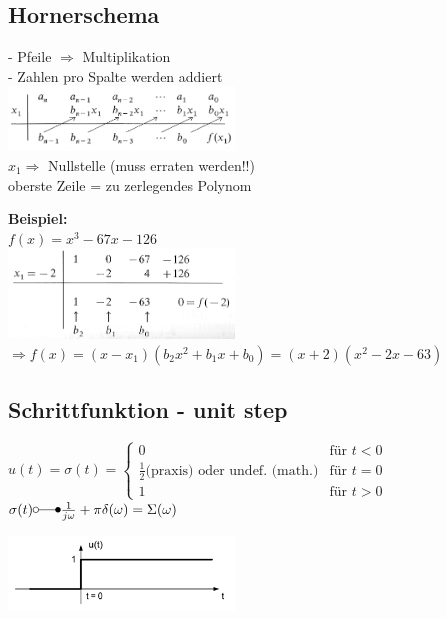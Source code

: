 \subsection{Hornerschema}
	\begin{minipage}[t]{9cm}
		- Pfeile $\Rightarrow$ Multiplikation\\
		- Zahlen pro Spalte werden addiert\\
		\includegraphics[width=6cm]{./bilder/hornerschema_1.png}\\
		$x_1 \Rightarrow$ Nullstelle (muss erraten werden!!)\\
		oberste Zeile = zu zerlegendes Polynom			
	\end{minipage}
	\begin{minipage}[t]{9cm}
		\textbf{Beispiel:}\\
		$f(x) = x^3-67x-126$\\
		\includegraphics[width=6cm]{./bilder/hornerschema_2.png}\\
		$\Rightarrow f(x) = (x-x_1)(b_2x^2 + b_1x + b_0) = (x+2)(x^2-2x-63)$	
	\end{minipage}

\subsection{Schrittfunktion - unit step}
	\begin{minipage}{10cm}
		$u(t) = \sigma(t) =	\begin{cases}
		  		 0 & \text{für } t < 0 \\
		  		 \frac{1}{2} \text{(praxis)}  \text{ oder undef. (math.)} & \text{für } t = 0 \\
		  		 1 & \text{für } t > 0
		  	\end{cases}
		$
		$\sigma(t) \laplace \frac{1}{j\omega} + \pi\delta(\omega) = \Sigma(\omega)$
	\end{minipage}
	\begin{minipage}{8cm}
		\includegraphics[width=6cm]{./bilder/unitstep.png}
	\end{minipage}

